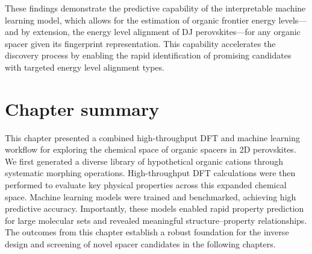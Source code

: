 These findings demonstrate the predictive capability of the interpretable machine learning model, which allows for the estimation of organic frontier energy levels—and by extension, the energy level alignment of DJ perovskites—for any organic spacer given its fingerprint representation. This capability accelerates the discovery process by enabling the rapid identification of promising candidates with targeted energy level alignment types.

\section{Chapter summary}

This chapter presented a combined high-throughput DFT and machine learning workflow for exploring the chemical space of organic spacers in 2D perovskites. We first generated a diverse library of hypothetical organic cations through systematic morphing operations. High-throughput DFT calculations were then performed to evaluate key physical properties across this expanded chemical space. Machine learning models were trained and benchmarked, achieving high predictive accuracy. Importantly, these models enabled rapid property prediction for large molecular sets and revealed meaningful structure–property relationships. The outcomes from this chapter establish a robust foundation for the inverse design and screening of novel spacer candidates in the following chapters.


